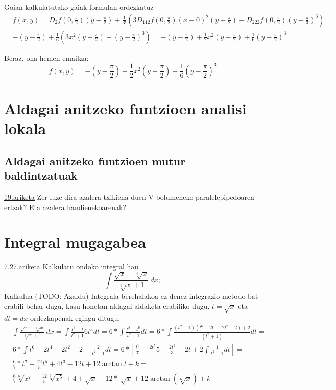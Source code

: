 Goian kalkulatutako gaiak formulan ordezkatuz
\begin{align*}
    &f(x,y)=D_2f(0,\frac{\pi}{2})\left(y-\frac{\pi}{2}\right)+\frac{1}{3!}\left(3D_{112}f(0,\frac{\pi}{2})(x-0)^2(y-\frac{\pi}{2})+ D_{222}f(0,\frac{\pi}{2})(y-\frac{\pi}{3})^3 \right)=\\
    &-\left(y-\frac{\pi}{2}\right)+\frac{1}{6}\left(3x^2(y-\frac{\pi}{2})+(y-\frac{\pi}{2})^3\right)=-\left(y-\frac{\pi}{2}\right)+\frac{1}{2}x^2\left(y-\frac{\pi}{2}\right)+\frac{1}{6}\left(y-\frac{\pi}{2}\right)^3
\end{align*}

Beraz, ona hemen emaitza:
\begin{equation*}
    \boxed{f(x,y)=-\left(y-\frac{\pi}{2}\right)+\frac{1}{2}x^2\left(y-\frac{\pi}{2}\right)+\frac{1}{6}\left(y-\frac{\pi}{2}\right)^3}
\end{equation*}

\chapter{Aldagai anitzeko funtzioen analisi lokala}
\section{Aldagai anitzeko funtzioen mutur baldintzatuak}
\underline{19.ariketa} Zer luze dira azalera txikiena duen V bolumeneko paralelepipedoaren ertzak? Eta azalera handienekoarenak?



\chapter{Integral mugagabea}
\underline{7.27.ariketa} Kalkulatu ondoko integral hau
\begin{equation*}
    \int \frac{\sqrt{x}-\sqrt[6]{x}}{\sqrt[3]{x}+1}\ dx;
\end{equation*}
Kalkulua (TODO: Azaldu)
Integrala berehalakoa ez denez integrazio metodo bat erabili behar dugu, kasu honetan aldagai-aldaketa erabiliko dugu. $t=\sqrt{x}$ eta $dt=dx$ ordezkapenak egingu ditugu.
\begin{equation*}
    \begin{split}
    &\int \frac{\sqrt{x}-\sqrt[6]{x}}{\sqrt[3]{x}+1}\ dx = \int \frac{t^3-t}{t^2+1}6t^5dt = 6 * \int \frac{t^8-t^6}{t^2+1}dt =
     6 * \int \frac{(t^2+1)(t^6-2t^9+2t^2-2)+2}{(t^2+1)}dt = & 
     \\ &6 * \int t^6-2t^4+2t^2-2+\frac{2}{t^2+1}dt = 6 * [\frac{t^7}{7}-\frac{2t^5}-{5}+\frac{2t^3}{3}-2t+2\int \frac{1}{t^2+1}dt] = &
     \\ & \frac{6}{7} * t^7 - \frac{12}{5}t^5+4t^3-12t+12\arctan{t} + k = &
     \\ &\frac{6}{7} \sqrt[6]{x^7}-\frac{12}{5}\sqrt[6]{x^5}+4+\sqrt{x}-12*\sqrt[6]{x}+12\arctan{(\sqrt[6]{x})}+k&
    \end{split}
\end{equation*}




